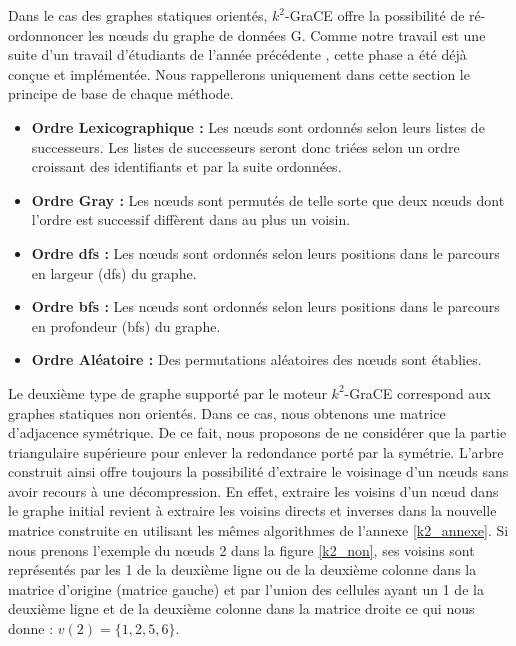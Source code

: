 \documentclass[a4paper,oneside,12pt]{report}
\theoremstyle{definition}
\begin{document}
			
			Dans le cas des graphes statiques orientés, $k^2$-GraCE offre la possibilité de ré-ordonnoncer les nœuds du graphe de données G.
			Comme notre travail est une suite d'un travail d'étudiants de l'année précédente \citep{master2017}, cette phase a été déjà conçue et implémentée. Nous rappellerons uniquement dans cette section le principe de base de chaque méthode. 
			
			\begin{itemize}[label=$\bullet$]
\item\textbf{Ordre Lexicographique :} Les nœuds sont ordonnés selon leurs listes de successeurs. Les listes de successeurs seront donc triées selon un ordre croissant des identifiants et par la suite ordonnées.

	
\item\textbf{Ordre Gray :} Les nœuds sont permutés de telle sorte que deux nœuds dont l'ordre est successif diffèrent dans au plus un voisin. 
\item\textbf{Ordre \gls{dfs} :} Les nœuds sont ordonnés selon leurs positions dans le parcours en largeur (\gls{dfs}) du graphe.  
\item\textbf{Ordre \gls{bfs} :} Les nœuds sont ordonnés selon leurs positions dans le parcours en profondeur (\gls{bfs}) du graphe. 
\item\textbf{Ordre Aléatoire :} Des permutations aléatoires des nœuds sont établies.
			
			\end{itemize}
		
	Le deuxième type de graphe supporté par le moteur $k^2$-GraCE correspond aux graphes statiques non orientés. Dans ce cas, nous obtenons une matrice d'adjacence symétrique. De ce fait, nous proposons de ne considérer que la partie triangulaire supérieure pour enlever la redondance porté par la symétrie. L'arbre construit ainsi offre toujours la possibilité d'extraire le voisinage d'un nœuds sans avoir recours à une décompression. En effet, extraire les voisins d'un nœud dans le graphe initial revient à extraire les voisins directs et inverses dans la nouvelle matrice construite en utilisant les mêmes algorithmes de l'annexe \ref{k2_annexe}.
	 Si nous prenons l'exemple du nœuds 2 dans la figure \ref{k2_non}, ses voisins sont représentés par les 1 de la deuxième ligne ou de la deuxième colonne dans la matrice d'origine (matrice gauche) et par l'union des cellules ayant un 1 de la deuxième ligne et de la deuxième colonne dans la matrice droite ce qui nous donne : $v(2) = \{1, 2, 5,6\}$.
	
\end{document}
